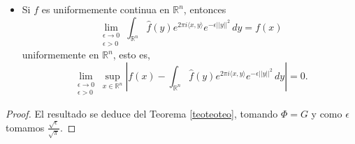 \begin{teorema}
\begin{itemize}
    \item  Si $f$ es uniformemente continua en $\mathbb{R}^n$, entonces
    \begin{equation}
              \lim_{\substack{\epsilon \rightarrow 0 \\ \epsilon >0}}\int_{\mathbb{R}^n}\widehat{f}(y)e^{2\pi i \langle x, y \rangle} e^{-\epsilon ||y||^2} \, dy  = f(x)
        \end{equation}
        uniformemente en $\mathbb{R}^n$,
        esto es, 
         \begin{equation}
        \lim_{\substack{\epsilon \rightarrow 0 \\ \epsilon > 0}} \sup_{x \in \mathbb{R}^n}  \left| f(x) -   \int_{\mathbb{R}^n}\widehat{f}(y)e^{2\pi i \langle x, y \rangle} e^{-\epsilon ||y||^2} \, dy \right|   = 0.
    \end{equation}
    \end{itemize}
\end{teorema}


\begin{proof}
    El resultado se deduce del Teorema \ref{teoteoteo}, tomando $\Phi = G$ y como $\epsilon$ tomamos $\frac{\sqrt{\epsilon}}{\sqrt{\pi}}$.
\end{proof}











